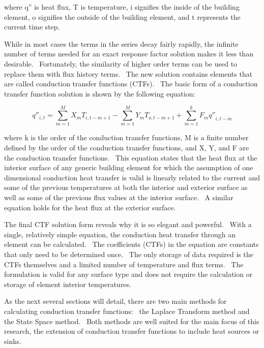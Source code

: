 where q'' is heat flux, T is temperature, i signifies the inside of the building element, o signifies the outside of the building element, and t represents the current time step.

While in most cases the terms in the series decay fairly rapidly, the infinite number of terms needed for an exact response factor solution makes it less than desirable.~ Fortunately, the similarity of higher order terms can be used to replace them with flux history terms.~ The new solution contains elements that are called conduction transfer functions (CTFs).~ The basic form of a conduction transfer function solution is shown by the following equation:

\begin{equation}
{q''_{i,t}} = \sum\limits_{m = 1}^M {{X_m}{T_{i,t - m + 1}}}  - \sum\limits_{m = 1}^M {{Y_m}{T_{o,t - m + 1}}}  + \sum\limits_{m = 1}^k {{F_m}{{q''}_{i,t - m}}}
\label{eq:LaplaceTransformDeriv623}
\end{equation}

where k is the order of the conduction transfer functions, M is a finite number defined by the order of the conduction transfer functions, and X, Y, and F are the conduction transfer functions.~ This equation states that the heat flux at the interior surface of any generic building element for which the assumption of one dimensional conduction heat transfer is valid is linearly related to the current and some of the previous temperatures at both the interior and exterior surface as well as some of the previous flux values at the interior surface.~ A similar equation holds for the heat flux at the exterior surface.

The final CTF solution form reveals why it is so elegant and powerful.~ With a single, relatively simple equation, the conduction heat transfer through an element can be calculated.~ The coefficients (CTFs) in the equation are constants that only need to be determined once.~ The only storage of data required is the CTFs themselves and a limited number of temperature and flux terms.~ The formulation is valid for any surface type and does not require the calculation or storage of element interior temperatures.

As the next several sections will detail, there are two main methods for calculating conduction transfer functions:~ the Laplace Transform method and the State Space method.~ Both methods are well suited for the main focus of this research, the extension of conduction transfer functions to include heat sources or sinks.

